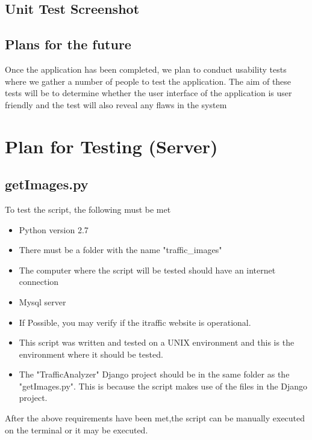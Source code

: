 \documentclass[a4paper,12pt]{article}
\begin{document}
\subsection{Unit Test Screenshot}

\subsection{Plans for the future}
Once the application has been completed, we plan to conduct usability tests where we gather a number of people to test the application. The aim of these tests will be to determine whether the user interface of the application is user friendly and the test will also reveal any flaws in the system
\section{Plan for Testing (Server)}
\subsection{getImages.py}
To test the script, the following must be met
\begin{itemize}
\item Python version 2.7
\item There must be a folder with the name "traffic\_images"
\item The computer where the script will be tested should have an internet connection
\item Mysql server
\item If Possible, you may verify if the itraffic website is operational.
\item This script was written and tested on a UNIX environment and this is the environment where it should be tested.
\item The "TrafficAnalyzer" Django project should be in the same folder as the "getImages.py". This is because the script makes use of the files in the Django project.
\end{itemize}

After the above requirements have been met,the script can be manually executed on the terminal or it may be executed.
\end{document}
